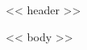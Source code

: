 \documentclass[9pt,letterpaper]{article}
\begin{document}
<< header >>

\vspace{0.5em}

<< body >>
\end{document}
